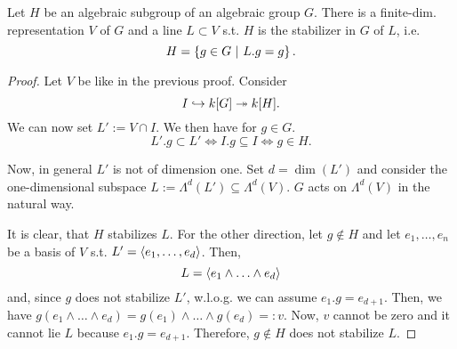 \begin{theorem}
Let $H$ be an algebraic subgroup of an algebraic group $G$. There is a finite-dim. representation $V$ of $G$ and a line $L \subset V$ s.t. $H$ is the stabilizer in $G$ of $L$, i.e.
\[ H= \left\lbrace g \in G ~ | ~ L.g = g\right\rbrace. \]
\end{theorem}
\begin{proof}
	Let $V$ be like in the previous proof. Consider
	\[ I \overset{}{\hookrightarrow} k[G] \overset{}{\twoheadrightarrow} k[H]. \]
	We can now set $L' := V \cap I$. We then have for $g \in G$.
	\[ L'.g \subset L' \iff I.g \subseteq I \iff g \in H. \]
	
	Now, in general $L'$ is not of dimension one. Set $d = \dim (L')$ and consider the one-dimensional subspace $L:=\Lambda^d(L') \subseteq \Lambda^d(V)$. $G$ acts on $\Lambda^d(V)$ in the natural way.
	
	It is clear, that $H$ stabilizes $L$. For the other direction, let $g \notin H$ and let $e_1,\ldots, e_n$ be a basis of $V$ s.t. $L' = \left<e_1,\ldots, e_d\right>$. Then,
	\[ L = \left<e_1\wedge \ldots \wedge e_d\right> \]
	and, since $g$ does not stabilize $L'$, w.l.o.g. we can assume $e_1.g = e_{d+1}$.
	Then, we have $g(e_1\wedge \ldots \wedge e_d) = g(e_1)\wedge \ldots \wedge g(e_d) =: v$. Now, $v$ cannot be zero and it cannot lie $L$ because $e_1.g = e_{d+1}$. Therefore, $g\notin H$ does not stabilize $L$.
\end{proof}

